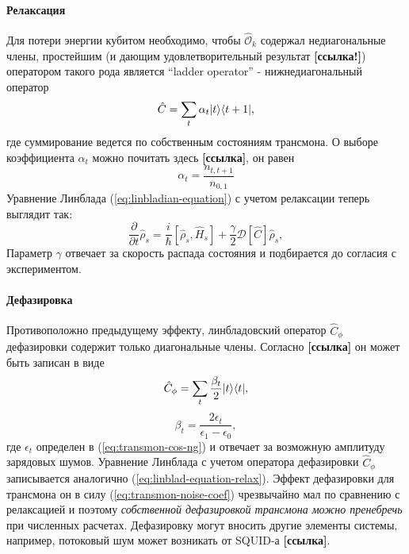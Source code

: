 \documentclass[12pt, twoside]{report}
\DeclarePairedDelimiter\bra{\langle}{\rvert}
\DeclarePairedDelimiter\ket{\lvert}{\rangle}
\newcommand{\sbrkt}[1]{\left[ #1 \right]}
\numberwithin{equation}{section}
\numberwithin{figure}{section}
\begin{document}
\paragraph{Релаксация}
Для потери энергии кубитом необходимо, чтобы $\mathcal{\hat O}_k$ содержал недиагональные члены, простейшим (и дающим удовлетворительный результат \textbf{[ссылка!]}) оператором такого рода является ``ladder operator'' - нижнедиагональный оператор
\begin{equation}
\hat C = \sum_t \alpha_t \ket{t} \bra{t+1},
\label{eq:transmon-relax-operator}
\end{equation}
где суммирование ведется по собственным состояниям трансмона. О выборе коэффициента $\alpha_t$ можно почитать здесь \textbf{[ссылка]}, он равен 
\begin{equation}
\alpha_t = \frac{n_{t,t+1}}{n_{0,1}}
\label{eq:transmon-relax-coef}
\end{equation}
Уравнение Линблада (\ref{eq:linbladian-equation}) с учетом релаксации теперь выглядит так:
\begin{equation}
\frac{\partial}{\partial t}\hat \rho_s = 
 \frac{i}{\hbar}\sbrkt{\hat \rho_s, \hat{H}_s} +  \frac{\gamma}{2} \mathcal{D}\sbrkt{\hat C}\hat \rho_s,
\label{eq:linblad-equation-relax}
\end{equation}
Параметр $\gamma$ отвечает за скорость распада состояния и подбирается до согласия с экспериментом.
\paragraph{Дефазировка}
Противоположно предыдущему эффекту, линбладовский оператор $\hat C_\phi$ дефазировки содержит только диагональные члены. Согласно \textbf{[ссылка]} он может быть записан в виде
$$
\hat C_\phi = \sum_t \frac{\beta_t}{2} \ket{t} \bra{t},
$$
\begin{equation}
\beta_t = \frac{2 \epsilon_t}{\epsilon_1 - \epsilon_0}, 
\end{equation}
где $\epsilon_t$ определен в (\ref{eq:transmon-cos-ng}) и отвечает за возможную амплитуду зарядовых шумов. Уравнение Линблада с учетом оператора дефазировки $\hat C_\phi $записывается аналогично (\ref{eq:linblad-equation-relax}). Эффект дефазировки для трансмона он в силу (\ref{eq:transmon-noise-coef}) чрезвычайно мал по сравнению с релаксацией и поэтому \textit{собственной дефазировкой трансмона можно пренебречь} при численных расчетах. \newline
Дефазировку могут вносить другие элементы системы, например, потоковый шум может возникать от SQUID-а \textbf{[ссылка]}.

\end{document}

